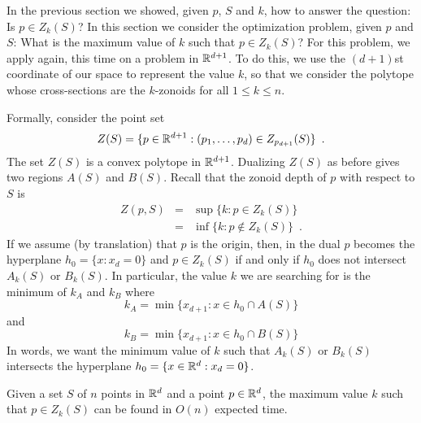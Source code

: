 \documentclass[lotsofwhite]{patmorin}
\begin{document}
In the previous section we showed, given $p$, $S$ and $k$, how to
answer the question:  Is $p\in Z_k(S)$?  In this section we consider
the optimization problem, given $p$ and $S$: What is the maximum value
of $k$ such that $p\in Z_k(S)$?  For this problem, we apply
 again, this time on a problem in $\mathbb{R}^{d+1}$.  To do
this, we use the $(d+1)$st coordinate of our space to represent the
value $k$, so that we consider the polytope whose cross-sections are
the $k$-zonoids for all $1\le k\le n$.

Formally,
consider the point set
\[
    Z(S)=\{p\in\mathbb{R}^{d+1} : (p_1,\ldots,p_d)\in Z_{p_{d+1}}(S)  \} \enspace .
\]
The set $Z(S)$ is a convex polytope in $\mathbb{R}^{d+1}$.
Dualizing $Z(S)$ as before gives two regions
$A(S)$ and $B(S)$.
Recall that
the zonoid depth  of $p$ with respect to $S$ is
\begin{eqnarray*}
   Z(p,S) & = & \sup\{k:p\in Z_k(S)\} \\
          & = & \inf\{k:p\notin Z_k(S) \} \enspace .
\end{eqnarray*}
If we assume (by translation) that $p$ is the origin, then,
in the dual $p$ becomes the hyperplane $h_0=\{x:x_d=0\}$ and $p\in
Z_k(S)$ if and only if $h_0$ does not intersect $A_k(S)$ or $B_k(S)$.
In particular, the value $k$ we are searching for is the minimum of
$k_A$ and $k_B$ where
\[
   k_A = \min\{x_{d+1}: x\in h_0\cap A(S)\}
\]
and
\[
   k_B = \min\{x_{d+1}: x\in h_0\cap B(S)\}
\]
In words, we want the minimum value of $k$ such that $A_k(S)$ or
$B_k(S)$ intersects the hyperplane $h_0=\{x\in\mathbb{R}^d: x_d=0\}$.

\begin{thm}
Given a set $S$ of $n$ points in $\mathbb{R}^d$ and a point $p\in\mathbb{R}^d$, the
maximum value $k$ such that $p\in Z_k(S)$ can be found in $O(n)$
expected time.
\end{thm}
\end{document}
